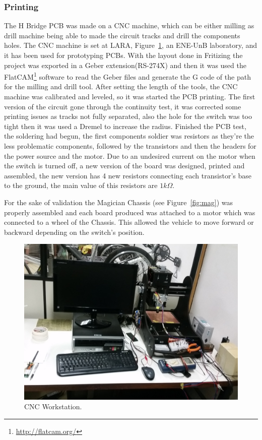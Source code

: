     \subsubsection{Printing} %
    \label{ssub:printing}
        The H Bridge PCB was made on a CNC machine, which can be either milling as drill machine being able to made the circuit tracks and drill the components holes. The CNC machine is set at LARA, Figure~\ref{fig:workstation}, an ENE-UnB laboratory, and it has been used for prototyping PCBs. With the layout done in Fritizing the project was exported in a Geber extension(RS-274X) and then it was used the FlatCAM\footnote{\url{http://flatcam.org/}} software to read the Geber files and generate the G code of the path for the milling and drill tool. After setting the length of the tools, the CNC machine was calibrated and leveled, so it was started the PCB printing. The first version of the circuit gone through the continuity test, it was corrected some printing issues as tracks not fully separated, also the hole for the switch was too tight then it was used a Dremel to increase the radius. Finished the PCB test, the soldering had begun, the first components soldier was resistors as they're the less problematic components, followed by the transistors and then the headers for the power source and the motor. Due to an undesired current on the motor when the switch is turned off, a new version of the board was designed, printed and assembled, the new version has 4 new resistors connecting each transistor's base to the ground, the main value of this resistors are $1k\Omega$.
	
	For the sake of validation the Magician Chassis (see Figure~\ref{fig:mag}) was properly assembled and each board produced was attached to a motor which was connected to a wheel of the Chassis. This allowed the vehicle to move forward or backward depending on the switch's position.

\begin{figure}[t]
\centering
\centering%
\includegraphics[height=.35\textwidth]{img/workstation_cnc.jpg}
\caption{CNC Workstation.}
\label{fig:workstation}%
\end{figure}

